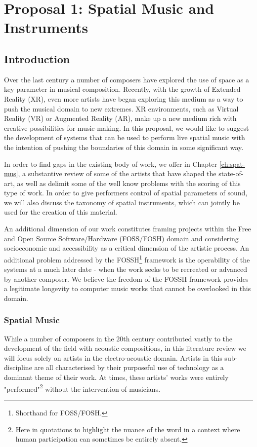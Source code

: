 \chapter{Proposal 1: Spatial Music and Instruments}

\section{Introduction}

Over the last century a number of composers have explored the use of space as a key parameter in musical composition. Recently, with the growth of Extended Reality (XR), even more artists have began exploring this medium as a way to push the musical domain to new extremes. XR environments, such as Virtual Reality (VR) or Augmented Reality (AR), make up a new medium rich with creative possibilities for music-making. In this proposal, we would like to suggest the development of systems that can be used to perform live spatial music with the intention of pushing the boundaries of this domain in some significant way. 

In order to find gaps in the existing body of work, we offer in Chapter \ref{ch:spat-mus}, a substantive review of some of the artists that have shaped the state-of-art, as well as delimit some of the well know problems with the scoring of this type of work. In order to give performers control of spatial parameters of sound, we will also discuss the taxonomy of spatial instruments, which can jointly be used for the creation of this material. 

An additional dimension of our work constitutes framing projects within the Free and Open Source Software/Hardware (FOSS/FOSH) domain and considering socioeconomic and accessibility as a critical dimension of the artistic process. An additional problem addressed by the FOSSH\footnote{Shorthand for FOSS/FOSH.} framework is the operability of the systems at a much later date - when the work seeks to be recreated or advanced by another composer. We believe the freedom of the FOSSH framework provides a legitimate longevity to computer music works that cannot be overlooked in this domain. 

\subsection{Spatial Music} 
While a number of composers in the 20th century contributed vastly to the development of the field with acoustic compositions, in this literature review we will focus solely on artists in the electro-acoustic domain. Artists in this sub-discipline are all characterised by their purposeful use of technology as a dominant theme of their work. At times, these artists' works were entirely "performed"\footnote{Here in quotations to highlight the nuance of the word in a context where human participation can sometimes be entirely absent.} without the intervention of musicians. 

